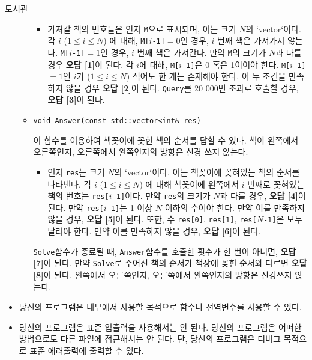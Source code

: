 \begin{problem}{도서관}
\begin{itemize}
\begin{itemize}
			\begin{itemize}
				\item 가져갈 책의 번호들은 인자 \texttt{M}으로 표시되며, 이는 크기 $N$의 `vector`이다. 각 $i$ ($1 \le i \le N$) 에 대해, \texttt{M[}$i$\texttt{-1]}$=0$인 경우, $i$ 번째 책은 가져가지 않는다. \texttt{M[}$i$\texttt{-1]}$=1$인 경우, $i$ 번째 책은 가져간다. 만약 \texttt{M}의 크기가 $N$과 다를 경우 \textbf{오답 [1]}이 된다. 각 $i$에 대해, \texttt{M[}$i$\texttt{-1]}은 0 혹은 1이어야 한다. \texttt{M[}$i$\texttt{-1]}$=1$인 $i$가 ($1 \le i \le N$) 적어도 한 개는 존재해야 한다. 이 두 조건을 만족하지 않을 경우 \textbf{오답 [2]}이 된다. \texttt{Query}를 20 000번 초과로 호출할 경우, \textbf{오답 [3]}이 된다.
			\end{itemize}
			
			\item \texttt{void Answer(const std::vector<int\& res)}
			
			이 함수를 이용하여 책꽂이에 꽂힌 책의 순서를 답할 수 있다. 책이 왼쪽에서 오른쪽인지, 오른쪽에서 왼쪽인지의 방향은 신경 쓰지 않는다.
			
			\begin{itemize}
				\item 인자 \texttt{res}는 크기 $N$의 `vector`이다. 이는 책꽂이에 꽂혀있는 책의 순서를 나타낸다. 각 $i$ ($1 \le i \le N$) 에 대해 책꽂이에 왼쪽에서 $i$ 번째로 꽂혀있는 책의 번호는 \texttt{res[}$i$\texttt{-1]}이다. 만약 \texttt{res}의 크기가 $N$과 다를 경우, \textbf{오답 [4]}이 된다. 만약 \texttt{res[}$i$\texttt{-1]}는 1 이상 $N$ 이하의 수여야 한다. 만약 이를 만족하지 않을 경우, \textbf{오답 [5]}이 된다. 또한, 수 \texttt{res[0]}, \texttt{res[1]}, \texttt{res[}$N$\texttt{-1]}은 모두 달라야 한다. 만약 이를 만족하지 않을 경우, \textbf{오답 [6]}이 된다.
			\end{itemize}
			
			\texttt{Solve}함수가 종료될 때, \texttt{Answer}함수를 호출한 횟수가 한 번이 아니면, \textbf{오답 [7]}이 된다.
			만약 \texttt{Solve}로 주어진 책의 순서가 책장에 꽂힌 순서와 다르면 \textbf{오답 [8]}이 된다. 왼쪽에서 오른쪽인지, 오른쪽에서 왼쪽인지의 방향은 신경쓰지 않는다.
		\end{itemize}
		
	\end{itemize}
	
	\Notes
	
	\begin{itemize}
		\item 당신의 프로그램은 내부에서 사용할 목적으로 함수나 전역변수를 사용할 수 있다.
		\item 당신의 프로그램은 표준 입출력을 사용해서는 안 된다. 당신의 프로그램은 어떠한 방법으로도 다른 파일에 접근해서는 안 된다. 단, 당신의 프로그램은 디버그 목적으로 표준 에러출력에 출력할 수 있다.
	\end{itemize}
	

\end{problem}
